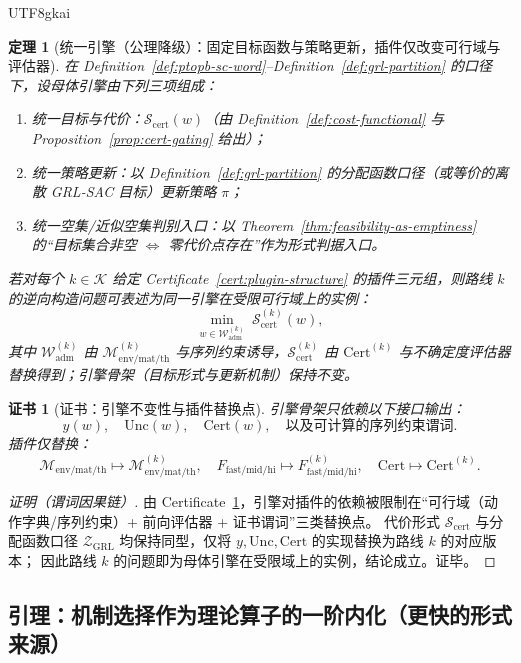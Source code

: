 \documentclass[12pt]{article}
\newtheorem{theorem}{定理}[section]
\newtheorem{certificate}{证书}[section]
\begin{document}
\begin{CJK*}{UTF8}{gkai}
\begin{theorem}[统一引擎（公理降级）：固定目标函数与策略更新，插件仅改变可行域与评估器]
\label{thm:unified-engine}
在 Definition~\ref{def:ptopb-sc-word}--Definition~\ref{def:grl-partition} 的口径下，设母体引擎由下列三项组成：
\begin{enumerate}
  \item 统一目标与代价：$\mathcal{S}_{\mathrm{cert}}(w)$（由 Definition~\ref{def:cost-functional} 与 Proposition~\ref{prop:cert-gating} 给出）；
  \item 统一策略更新：以 Definition~\ref{def:grl-partition} 的分配函数口径（或等价的离散 GRL-SAC 目标）更新策略 $\pi$；
  \item 统一空集/近似空集判别入口：以 Theorem~\ref{thm:feasibility-as-emptiness} 的“目标集合非空 $\Leftrightarrow$ 零代价点存在”作为形式判据入口。
\end{enumerate}
若对每个 $k\in\mathcal{K}$ 给定 Certificate~\ref{cert:plugin-structure} 的插件三元组，则路线 $k$ 的逆向构造问题可表述为同一引擎在受限可行域上的实例：
\[
\min_{w\in \mathcal{W}^{(k)}_{\mathrm{adm}}}\ \mathcal{S}_{\mathrm{cert}}^{(k)}(w),
\]
其中 $\mathcal{W}^{(k)}_{\mathrm{adm}}$ 由 $\mathcal{M}^{(k)}_{\mathrm{env/mat/th}}$ 与序列约束诱导，$\mathcal{S}_{\mathrm{cert}}
  ^{(k)}$ 由 $\mathrm{Cert}^{(k)}$ 与不确定度评估器替换得到；引擎骨架（目标形式与更新机制）保持不变。
\end{theorem}

\begin{certificate}[证书：引擎不变性与插件替换点]
\label{cert:engine-invariance}
引擎骨架只依赖以下接口输出：
\[
y(w),\quad \mathrm{Unc}(w),\quad \mathrm{Cert}(w),\quad \text{以及可计算的序列约束谓词}.
\]
插件仅替换：
\[
\mathcal{M}_{\mathrm{env/mat/th}}\mapsto \mathcal{M}^{(k)}_{\mathrm{env/mat/th}},\quad
F_{\mathrm{fast/mid/hi}}\mapsto F^{(k)}_{\mathrm{fast/mid/hi}},\quad
\mathrm{Cert}\mapsto \mathrm{Cert}^{(k)}.
\]
\end{certificate}

\begin{proof}[证明（谓词因果链）]
由 Certificate~\ref{cert:engine-invariance}，引擎对插件的依赖被限制在“可行域（动作字典/序列约束）+ 前向评估器 + 证书谓词”三类替换点。
代价形式 $\mathcal{S}_{\mathrm{cert}}$ 与分配函数口径 $\mathcal{Z}_{\mathrm{GRL}}$ 均保持同型，仅将 $y,\mathrm{Unc},\mathrm{Cert}$ 的实现替换为路线
  $k$ 的对应版本；
因此路线 $k$ 的问题即为母体引擎在受限域上的实例，结论成立。证毕。
\end{proof}

\subsection{引理：机制选择作为理论算子的一阶内化（更快的形式来源）}


\end{CJK*}
\end{document}
